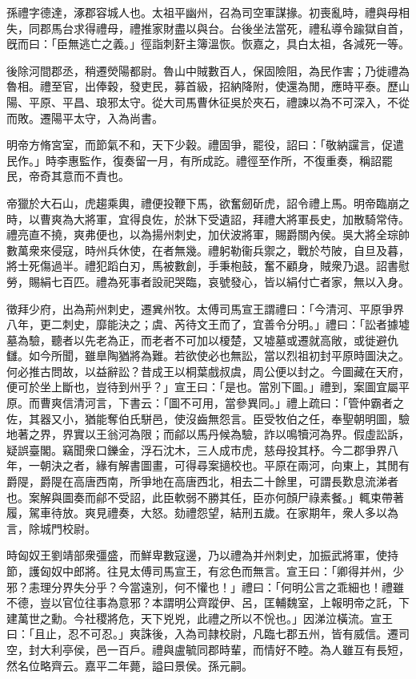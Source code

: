 \begin{pinyinscope}
 
 
 孫禮字德達，涿郡容城人也。太祖平幽州，召為司空軍謀掾。初喪亂時，禮與母相失，同郡馬台求得禮母，禮推家財盡以與台。台後坐法當死，禮私導令踰獄自首，旣而曰：「臣無逃亡之義。」徑詣刺姧主簿溫恢。恢嘉之，具白太祖，各減死一等。
 
 
 
 
 後除河間郡丞，稍遷熒陽都尉。魯山中賊數百人，保固險阻，為民作害；乃徙禮為魯相。禮至官，出俸穀，發吏民，募首級，招納降附，使還為閒，應時平泰。歷山陽、平原、平昌、琅邪太守。從大司馬曹休征吳於夾石，禮諫以為不可深入，不從而敗。遷陽平太守，入為尚書。
 
 
 
 
 明帝方脩宮室，而節氣不和，天下少穀。禮固爭，罷役，詔曰：「敬納讜言，促遣民作。」時李惠監作，復奏留一月，有所成訖。禮徑至作所，不復重奏，稱詔罷民，帝奇其意而不責也。
 
 
 
 
 帝獵於大石山，虎趨乘輿，禮便投鞭下馬，欲奮劒斫虎，詔令禮上馬。明帝臨崩之時，以曹爽為大將軍，宜得良佐，於牀下受遺詔，拜禮大將軍長史，加散騎常侍。禮亮直不撓，爽弗便也，以為揚州刺史，加伏波將軍，賜爵關內侯。吳大將全琮帥數萬衆來侵寇，時州兵休使，在者無幾。禮躬勒衞兵禦之，戰於芍陂，自旦及暮，將士死傷過半。禮犯蹈白刃，馬被數創，手秉枹鼓，奮不顧身，賊衆乃退。詔書慰勞，賜絹七百匹。禮為死事者設祀哭臨，哀號發心，皆以絹付亡者家，無以入身。
 
 
 
 
 徵拜少府，出為荊州刺史，遷兾州牧。太傅司馬宣王謂禮曰：「今清河、平原爭界八年，更二刺史，靡能決之；虞、芮待文王而了，宜善令分明。」禮曰：「訟者據墟墓為驗，聽者以先老為正，而老者不可加以榎楚，又墟墓或遷就高敞，或徙避仇讎。如今所聞，雖臯陶猶將為難。若欲使必也無訟，當以烈祖初封平原時圖決之。何必推古問故，以益辭訟？昔成王以桐葉戲叔虞，周公便以封之。今圖藏在天府，便可於坐上斷也，豈待到州乎？」宣王曰：「是也。當別下圖。」禮到，案圖宜屬平原。而曹爽信清河言，下書云：「圖不可用，當參異同。」禮上疏曰：「管仲霸者之佐，其器又小，猶能奪伯氏駢邑，使沒齒無怨言。臣受牧伯之任，奉聖朝明圖，驗地著之界，界實以王翁河為限；而鄃以馬丹候為驗，詐以鳴犢河為界。假虛訟訴，疑誤臺閣。竊聞衆口鑠金，浮石沈木，三人成巿虎，慈母投其杼。今二郡爭界八年，一朝決之者，緣有解書圖畫，可得尋案擿校也。平原在兩河，向東上，其閒有爵隄，爵隄在高唐西南，所爭地在高唐西北，相去二十餘里，可謂長歎息流涕者也。案解與圖奏而鄃不受詔，此臣軟弱不勝其任，臣亦何顏尸祿素餐。」輒束帶著履，駕車待放。爽見禮奏，大怒。劾禮怨望，結刑五歲。在家期年，衆人多以為言，除城門校尉。
 
 
 
 
 時匈奴王劉靖部衆彊盛，而鮮卑數寇邊，乃以禮為并州刺史，加振武將軍，使持節，護匈奴中郎將。往見太傅司馬宣王，有忿色而無言。宣王曰：「卿得并州，少邪？恚理分界失分乎？今當遠別，何不懽也！」禮曰：「何明公言之乖細也！禮雖不德，豈以官位往事為意邪？本謂明公齊蹤伊、呂，匡輔魏室，上報明帝之託，下建萬世之勳。今社稷將危，天下兇兇，此禮之所以不恱也。」因涕泣橫流。宣王曰：「且止，忍不可忍。」爽誅後，入為司隷校尉，凡臨七郡五州，皆有威信。遷司空，封大利亭侯，邑一百戶。禮與盧毓同郡時輩，而情好不睦。為人雖互有長短，然名位略齊云。嘉平二年薨，謚曰景侯。孫元嗣。
 
 
\end{pinyinscope}